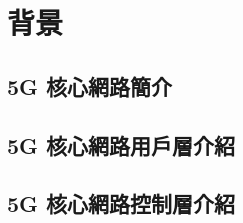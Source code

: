 \chapter{背景}
\label{chapter:background}


\section{5G 核心網路簡介}
\label{subsec:background}

\section{5G 核心網路用戶層介紹}
\label{subsec:background}

\section{5G 核心網路控制層介紹}
\label{subsec:background}
